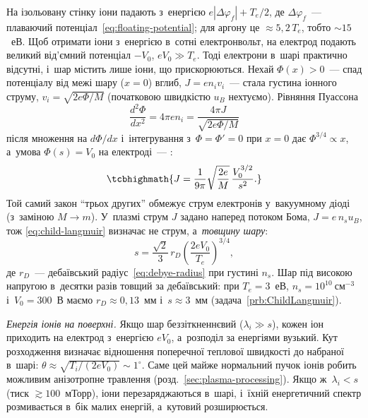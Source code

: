 На ізольовану стінку іони падають з~енергією $e|\Delta\varphi_f|+T_e/2$, де
$\Delta\varphi_f$~--- плаваючий потенціал~\eqref{eq:floating-potential}; для аргону це $\approx5{,}2\,T_e$,
тобто $\sim15$~еВ. Щоб отримати іони з~енергією в~сотні електронвольт, на електрод подають
великий від'ємний потенціал $-V_0$, $eV_0\gg T_e$. Тоді електрони в~шарі практично відсутні, і~шар
містить лише іони, що прискорюються. Нехай $\Phi(x)>0$~--- спад потенціалу від межі шару ($x=0$)
вглиб, $J=en_iv_i$~--- стала густина іонного струму, $v_i=\sqrt{2e\Phi/M}$ (початковою швидкістю
$u_B$ нехтуємо). Рівняння Пуассона
\begin{equation*}
	\frac{d^2\Phi}{dx^2}=4\pi en_i=\frac{4\pi J}{\sqrt{2e\Phi/M}}
\end{equation*}
після множення на $d\Phi/dx$ і~інтегрування з~$\Phi=\Phi'=0$ при $x=0$ дає $\Phi^{3/4}\propto x$,
а~умова $\Phi(s)=V_0$ на електроді~--- :
\begin{equation}\label{eq:child-langmuir}
	\tcbhighmath{J=\frac1{9\pi}\sqrt{\frac{2e}{M}}\,\frac{V_0^{3/2}}{s^2}.}
\end{equation}
Той самий закон \enquote{трьох других} обмежує струм електронів у~вакуумному діоді
(з~заміною $M\to m$). У~плазмі струм $J$ задано наперед потоком Бома, $J=e\,n_su_B$, тож
\eqref{eq:child-langmuir} визначає не струм, а~\emph{товщину шару}:
\begin{equation}\label{eq:sheath-thickness}
	s=\frac{\sqrt2}{3}\,r_D\left(\frac{2eV_0}{T_e}\right)^{3/4},
\end{equation}
де $r_D$~--- дебаївський радіус~\eqref{eq:debye-radius} при густині $n_s$. Шар під високою напругою
в~десятки разів товщий за дебаївський: при $T_e=3$~еВ, $n_s=10^{10}~\mathrm{см}^{-3}$ і~$V_0=300$~В
маємо $r_D\approx0{,}13$~мм і~$s\approx3$~мм (задача~\ref{prb:ChildLangmuir}).

\emph{Енергія іонів на поверхні.} Якщо шар беззіткненнєвий ($\lambda_i\gg s$), кожен іон приходить
на електрод з~енергією $eV_0$, а~розподіл за енергіями вузький. Кут розходження
визначає відношення поперечної теплової швидкості до набраної в~шарі:
$\theta\approx\sqrt{T_i/(2eV_0)}\sim1^\circ$. Саме цей майже нормальний пучок іонів робить
можливим анізотропне травлення (розд.~\ref{sec:plasma-processing}). Якщо ж~$\lambda_i<s$ (тиск
$\gtrsim100$~мТорр), іони перезаряджаються в~шарі, і~їхній енергетичний спектр розмивається в~бік
малих енергій, а~кутовий розширюється.

